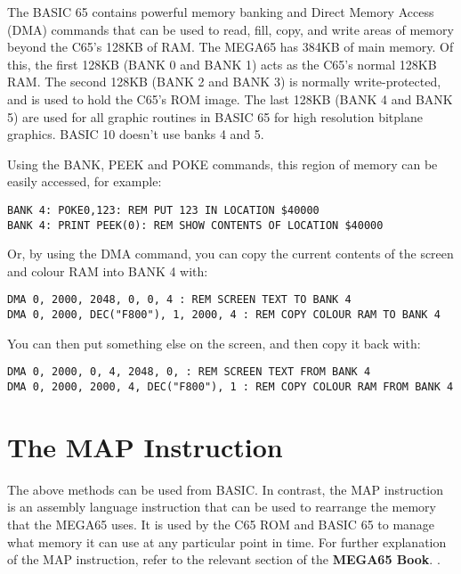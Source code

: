 The BASIC 65 contains powerful memory banking and Direct Memory Access (DMA) commands that can be used to read,
fill, copy, and write areas of memory beyond the C65's 128KB of RAM.  The MEGA65 has 384KB of main memory. Of this,
the first 128KB (BANK 0 and BANK 1) acts as the C65's normal 128KB RAM. The second 128KB (BANK 2 and BANK 3) is normally
write-protected, and is used to hold the C65's ROM image.
The last 128KB (BANK 4 and BANK 5) are used for all graphic routines
in BASIC 65 for high resolution bitplane graphics.
BASIC 10 doesn't use banks 4 and 5.

Using the BANK, PEEK and POKE commands, this region of memory can be easily accessed, for example:

\begin{tcolorbox}[colback=black,coltext=white]
\verbatimfont{\codefont}
\begin{verbatim}
BANK 4: POKE0,123: REM PUT 123 IN LOCATION $40000
BANK 4: PRINT PEEK(0): REM SHOW CONTENTS OF LOCATION $40000
\end{verbatim}
\end{tcolorbox}

Or, by using the DMA command, you can copy the current contents of the screen and colour RAM into BANK 4 with:

\begin{tcolorbox}[colback=black,coltext=white]
\verbatimfont{\codefont}
\begin{verbatim}
DMA 0, 2000, 2048, 0, 0, 4 : REM SCREEN TEXT TO BANK 4
DMA 0, 2000, DEC("F800"), 1, 2000, 4 : REM COPY COLOUR RAM TO BANK 4
\end{verbatim}
\end{tcolorbox}

You can then put something else on the screen, and then copy it back with:

\begin{tcolorbox}[colback=black,coltext=white]
\verbatimfont{\codefont}
\begin{verbatim}
DMA 0, 2000, 0, 4, 2048, 0, : REM SCREEN TEXT FROM BANK 4
DMA 0, 2000, 2000, 4, DEC("F800"), 1 : REM COPY COLOUR RAM FROM BANK 4
\end{verbatim}
\end{tcolorbox}

\section{The MAP Instruction}

The above methods can be used from BASIC. In contrast, the MAP instruction is an assembly
language instruction that can be used to rearrange the memory that the MEGA65 uses.
It is used by the C65 ROM and BASIC 65 to manage what memory it can use at any particular
point in time.  For further explanation of the MAP instruction,
refer to the relevant section of
\ifdefined\printmanual
 the {\bf MEGA65 Book}.
\else
 .
\fi



